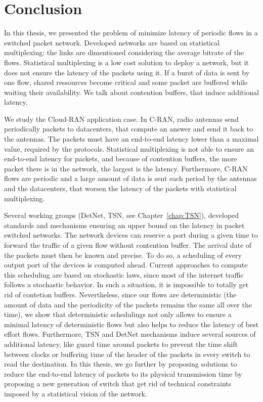 
\chapter*{Conclusion}
\label{chap:concl}

In this thesis, we presented the problem of minimize latency of periodic flows in a switched packet network. Developed networks are based on statistical multiplexing: the links are dimentioned considering the average bitrate of the flows. Statistical multiplexing is a low cost solution to deploy a network, but it does not ensure the latency of the packets using it. If a burst of data is sent by one flow, shared ressources become critical and some packet are buffered while waiting their availability. We talk about contention buffers, that induce additional latency.

We study the Cloud-RAN application case. In C-RAN, radio antennas send periodically packets to datacenters, that compute an answer and send it back to the antennas. The packets must have an end-to-end latency lower than a maximal value, required by the protocols. Statistical multiplexing is not able to ensure an end-to-end latency for packets, and because of contention buffers,  the more packet there is in the network, the largest is the latency. Furthermore, C-RAN flows are periodic and a large amount of data is sent each period by the antennas and the datacenters, that worsen the latency of the packets with statistical multiplexing.

Several working groups (DetNet, TSN, see Chapter~\ref{chap:TSN}), developed standards and mechanisms ensuring an upper bound on the latency in packet switched networks. The network devices can reserve a port during a given time to forward the traffic of a given flow without contention buffer. The arrival date of the packets must then be known and precise. To do so, a scheduling of every output port of the devices is computed ahead. Current approaches to compute this scheduling are based on stochastic laws, since most of the internet traffic follows a stochastic behavior. In such a situation, it is impossible to totally get rid of contetion buffers. Nevertheless, since our flows are deterministic (the amount of data and the periodicity of the packets remains the same all over the time), we show that deterministic schedulings not only allows to ensure a minimal latency of deterministic flows but also helps to reduce the latency of best effort flows. 
Furthermore, TSN and DetNet mechanisms induce several sources of additional latency, like guard time around packets to prevent the time shift between clocks or buffering time of the header of the packets in every switch to read the destination. In this thesis, we go further by proposing solutions to reduce the end-to-end latency of packets to its physical transmission time by proposing a new generation of switch that get rid of technical constraints imposed by a statistical vision of the network.



